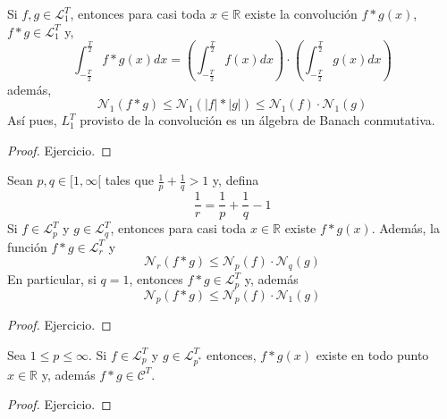 \documentclass[12pt]{report}
\theoremstyle{largebreak}
\newcommand\abs[1]{\ensuremath{\big|#1\big|}}
\newcommand{\N}[2]{\ensuremath{\mathcal{N}_{#1}\left(#2\right)}}
\begin{document}
    \begin{theor}
        Si $f,g\in\mathcal{L}_1^T$, entonces para casi toda $x\in\mathbb{R}$ existe la convolución $f*g(x)$, $f*g\in\mathcal{L}_1^T$ y,
        \begin{equation*}
            \int_{-\frac{T}{2}}^{\frac{T}{2}}f*g(x)dx=\left(\int_{-\frac{T}{2}}^{\frac{T}{2}}f(x)dx \right)\cdot\left(\int_{-\frac{T}{2}}^{\frac{T}{2}}g(x)dx\right)
        \end{equation*}
        además,
        \begin{equation*}
            \N{1}{f*g}\leq\N{1}{\abs{f}*\abs{g}}\leq\N{1}{f}\cdot\N{1}{g}
        \end{equation*}
        Así pues, $L_1^T$ provisto de la convolución es un álgebra de Banach conmutativa.
    \end{theor}

    \begin{proof}
        Ejercicio.
    \end{proof}

    \begin{theor}
        Sean $p,q\in[1,\infty[$ tales que $\frac{1}{p}+\frac{1}{q}>1$ y, defina
        \begin{equation*}
            \frac{1}{r}=\frac{1}{p}+\frac{1}{q}-1
        \end{equation*}
        Si $f\in\mathcal{L}_p^T$ y $g\in\mathcal{L}_q^T$, entonces para casi toda $x\in\mathbb{R}$ existe $f*g(x)$. Además, la función $f*g\in\mathcal{L}_r^T$ y
        \begin{equation*}
            \N{r}{f*g}\leq\N{p}{f}\cdot\N{q}{g}
        \end{equation*}
        En particular, si $q=1$, entonces $f*g\in\mathcal{L}_p^T$ y, además
        \begin{equation*}
            \N{p}{f*g}\leq\N{p}{f}\cdot\N{1}{g}
        \end{equation*}
    \end{theor}

    \begin{proof}
        Ejercicio.
    \end{proof}

    \begin{theor}
        Sea $1\leq p\leq \infty$. Si $f\in\mathcal{L}_p^T$ y $g\in\mathcal{L}_{p^*}^T$ entonces, $f*g(x)$ existe en todo punto $x\in\mathbb{R}$ y, además $f*g\in\mathcal{C}^T$.
    \end{theor}

    \begin{proof}
        Ejercicio.
    \end{proof}
\end{document}
